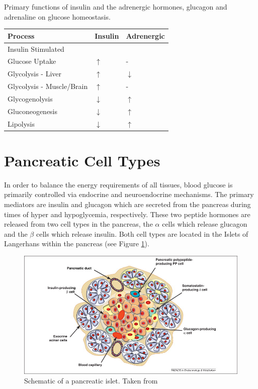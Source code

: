 \documentclass{tufte-handout}
\begin{document}
\begin{margintable}
\caption{Primary functions of insulin and the adrenergic hormones, glucagon and adrenaline on glucose homeostasis.}
\label{tab:endocrine-glucose}
\begin{tabular}{@{}lll@{}}
\textbf{Process }                          & \textbf{Insulin}  & \textbf{Adrenergic}           \\ \midrule
Insulin Stimulated \\Glucose Uptake & $\uparrow$ & -  \\ \midrule
Glycolysis - Liver & $\uparrow$ & $\downarrow$ \\  \midrule
Glycolysis - Muscle/Brain & $\uparrow$ & - \\  \midrule
Glycogenolysis & $\downarrow$ & $\uparrow$ \\ \midrule
Gluconeogenesis & $\downarrow$ & $\uparrow$\\ \midrule
Lipolysis & $\downarrow$ & $\uparrow$ \\ \bottomrule

\end{tabular}
\end{margintable}

\section{Pancreatic Cell Types}

In order to balance the energy requirements of all tissues, blood glucose is primarily controlled via endocrine and neuroendocrine mechanisms.  The primary mediators are insulin and glucagon which are secreted from the pancreas during times of hyper and hypoglycemia, respectively.  These two peptide hormones are released from two cell types in the pancreas, the $\alpha$ cells which release glucagon and the $\beta$ cells which release insulin.  Both cell types are located in the Islets of Langerhans within the pancreas (see Figure \ref{pancreas-cells}).

\begin{figure}
\includegraphics{figures/insulin-cells.png}
\caption{Schematic of a pancreatic islet.  Taken from \citet{Efrat2012}}
\label{pancreas-cells}
\end{figure}
\end{document}
